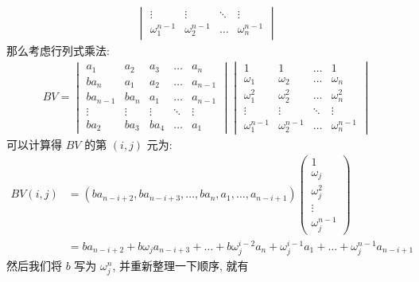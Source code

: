 \begin{exercise}[series=exer]
\begin{answer}
\begin{align*}
\begin{vmatrix}
                \vdots & \vdots & \ddots & \vdots\\
                \omega_{1}^{n-1} & \omega_{2}^{n-1} & \dots & \omega_{n}^{n-1}
            \end{vmatrix}
        \end{align*}
        那么考虑行列式乘法:
        \begin{align*}
            BV = 
            \begin{vmatrix}
                a_{1}   & a_{2} & a_{3} & \ldots    & a_{n} \\
                ba_{n}  & a_{1} & a_{2} & \ldots    & a_{n-1} \\
                ba_{n-1}    & ba_{n}    & a_{1} & \ldots & a_{n-1} \\
                \vdots  & \vdots & \vdots & \ddots & \vdots \\
                ba_{2} & ba_{3} & ba_{4} & \ldots & a_{1}
            \end{vmatrix}
            \begin{vmatrix}
                1 & 1 & \dots & 1\\
                \omega_{1} & \omega_{2} & \dots & \omega_{n}\\
                \omega_{1}^{2} & \omega_{2}^{2} & \dots & \omega_{n}^{2}\\
                \vdots & \vdots & \ddots & \vdots\\
                \omega_{1}^{n-1} & \omega_{2}^{n-1} & \dots & \omega_{n}^{n-1}
            \end{vmatrix}
        \end{align*}
        可以计算得 $ BV $ 的第 $ (i, j) $ 元为:
        \begin{align*}
            BV(i, j) & = (ba_{n-i+2}, ba_{n-i+3}, \dots, ba_{n}, a_{1}, \dots, a_{n-i+1})\begin{pmatrix}
                1 \\ \omega_{j} \\ \omega_{j}^{2} \\ \vdots \\ \omega_{j}^{n-1}
            \end{pmatrix}\\
            & = ba_{n-i+2} + b\omega_{j}a_{n-i+3} + \dots + b\omega_{j}^{i-2}a_{n} + \omega_{j}^{i-1}a_{1} + \dots + \omega_{j}^{n-1}a_{n-i+1}
        \end{align*}
        然后我们将 $ b $ 写为 $ \omega_{j}^{n} $, 并重新整理一下顺序, 就有
        \begin{align*}

\end{align*}
\end{answer}
\end{exercise}
